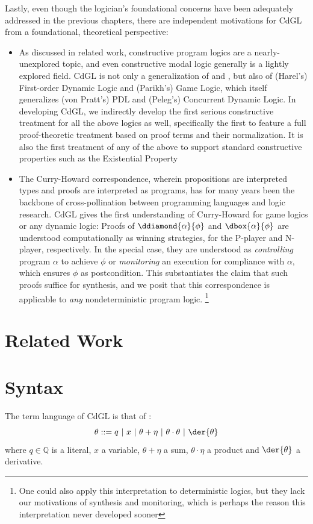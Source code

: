 \documentclass[12pt]{cmuthesis}
\theoremstyle{definition}
\theoremstyle{remark}
\newcommand{\bebecomes}{\mathrel{::=}}
\newcommand{\alternative}{~|~}
\newcommand{\CdGL}{\textsf{CdGL}\xspace}
\begin{document}
Lastly, even though the logician's foundational concerns have been adequately addressed in the previous chapters, there are independent motivations for \CdGL from a foundational, theoretical perspective:
\begin{itemize}
\item As discussed in related work, constructive program logics are a nearly-unexplored topic, and even constructive modal logic generally is a lightly explored field.
\CdGL is not only a generalization of  \dGL and \dL, but also of (Harel's) First-order Dynamic Logic and (Parikh's) Game Logic, which itself generalizes (von Pratt's) PDL and (Peleg's) Concurrent Dynamic Logic.
In developing \CdGL, we indirectly develop the first serious constructive treatment for all the above logics as well, specifically the first to feature a full proof-theoretic treatment based on proof terms and their normalization.
It is also the first treatment of any of the above to support standard constructive properties such as the Existential Property
\item
The Curry-Howard correspondence, wherein propositions are interpreted types and proofs are interpreted as programs,
has for many years been the backbone of cross-pollination between programming languages and logic research.
\CdGL gives the first understanding of Curry-Howard for game logics or any dynamic logic:
Proofs of $\ddiamond{\alpha}{\phi}$ and $\dbox{\alpha}{\phi}$ are understood computationally as winning strategies, for the P-player and N-player, respectively.
In the special case, they are understood as \emph{controlling} program $\alpha$ to achieve $\phi$ or \emph{monitoring} an execution for compliance with $\alpha,$ which ensures $\phi$ as postcondition.
This substantiates the claim that such proofs suffice for synthesis, and we posit that this correspondence is applicable to \emph{any} nondeterministic program logic.
\footnote{One could also apply this interpretation to deterministic logics, but they lack our motivations of synthesis and monitoring, which is perhaps the reason this interpretation never developed sooner}
\end{itemize}



\section{Related Work}
\newcommand{\semiset}[2]{\{#1~|~#2\}}
\section{Syntax}
The term language of \CdGL is that of \dL:
\[\theta \bebecomes  q \alternative x \alternative \theta + \eta \alternative \theta \cdot \theta \alternative \der{\theta}\]
where $q \in \mathbb{Q}$ is a literal, $x$ a variable, $\theta + \eta$ a sum, $\theta \cdot \eta$ a product and $\der{\theta}$ a derivative.
\end{document}
